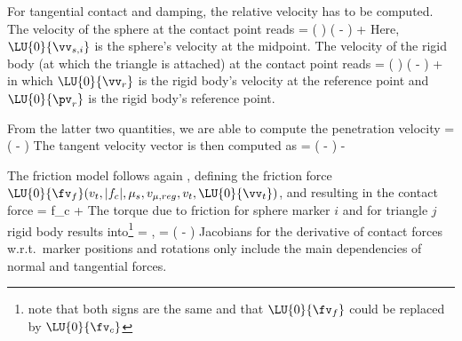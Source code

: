 For tangential contact and damping, the relative velocity has to be computed.
The velocity of the sphere at the contact point reads
\be
   = \left(   \right) \times \left(  -   \right) 
  + 
\ee
Here, $\LU{0}{\vv_{s,i}}$ is the sphere's velocity at the midpoint.
The velocity of the rigid body (at which the triangle is attached) at the contact point reads
\be
   = \left(   \right) \times \left(  -   \right) 
  + 
\ee
in which $\LU{0}{\vv_{r}}$ is the rigid body's velocity at the reference point and $\LU{0}{\pv_r}$ is the rigid body's reference point.

From the latter two quantities, we are able to compute the penetration velocity
\be
  \dot \Delta =  \left(  -  \right)
\ee
The tangent velocity vector is then computed as 
\be
   = \left(  -  \right) - \dot \Delta {}
\ee

The friction model follows again , defining the friction force $\LU{0}{\fv_f}(v_t, |f_c|, \mu_s, v_{\mu,reg}, v_t, \LU{0}{\vv_t} )$, and resulting in the contact force
\be
   = f_c \cdot {} + 
  \eqDot
\ee
The torque due to friction for sphere marker $i$ and for triangle $j$ rigid body results into\footnote{note that both signs are the same and that $\LU{0}{\fv_f}$ could be replaced by $\LU{0}{\fv_c}$}
\be
   =  \times {}, \quad
   = \left(   -  \right) \times {}
  \eqDot
\ee
Jacobians for the derivative of contact forces w.r.t.\ marker positions and rotations only include the main dependencies of normal and tangential forces.

